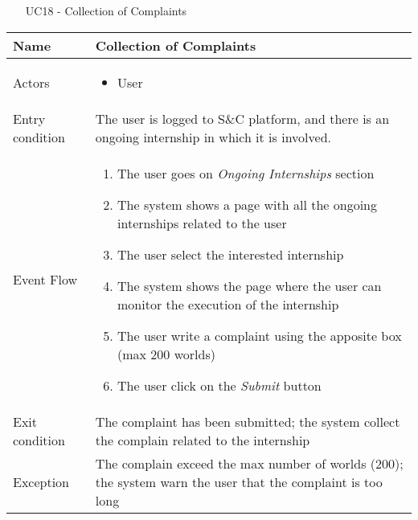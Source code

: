 				
				\begin{table} [H]
					\centering
					\begin{itemize}
						\item [UC18] - Collection of Complaints
					\end{itemize}
					
					\begin{tabular}{|| P{7.5cm} | P{7.5cm} ||}
						\hline
						Name & Collection of Complaints \\
						\hline
						Actors & \parbox{5cm}{\begin{itemize}
								\item User
							\end{itemize}
						} \\
						\hline
						Entry condition & The user is logged to S\&C platform, 
						and there is an ongoing internship in 
						which it is involved.  \\
						\hline
						Event Flow & \parbox{5cm}{\begin{enumerate}[label=\alpha]
								\item The user goes on \textit{Ongoing 
								Internships} section 
								\item The system shows a page with 
								all the ongoing internships 
								related to the user  
								\item The user select the interested 
								internship  
								\item The system shows the page 
								where the user can monitor the 
								execution of the internship
								\item The user write a complaint 
								using the apposite box (max 200 
								worlds) 
								\item The user click on the \textit{Submit}
								button
						\end{enumerate}} \\
						\hline 
						Exit condition & The complaint has been submitted; 
						the system collect the complain 
						related to the internship \\
						\hline
						Exception & The complain exceed the max number 
						of worlds (200); the system warn the 
						user that the complaint is too long \\
						\hline
					\end{tabular}
				\end{table}
				
